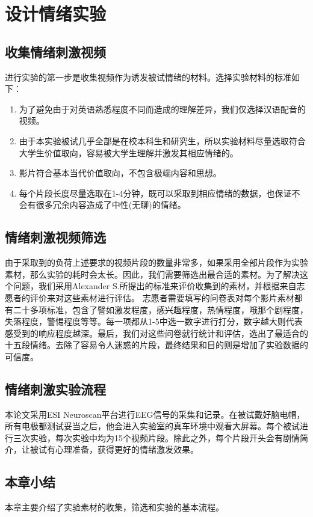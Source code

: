 
\chapter{设计情绪实验}
\label{chap:chap4}

\section{收集情绪刺激视频}
	进行实验的第一步是收集视频作为诱发被试情绪的材料。选择实验材料的标准如下：
	\begin{enumerate}
	\item 为了避免由于对英语熟悉程度不同而造成的理解差异，我们仅选择汉语配音的视频。
	\item 由于本实验被试几乎全部是在校本科生和研究生，所以实验材料尽量选取符合大学生价值取向，容易被大学生理解并激发其相应情绪的。
	
	\item 影片符合基本当代价值取向，不包含极端内容和思想。
	\item 每个片段长度尽量选取在1-4分钟，既可以采取到相应情绪的数据，也保证不会有很多冗余内容造成了中性(无聊)的情绪。
	\end{enumerate}
	
\section{情绪刺激视频筛选}
	由于采取到的负荷上述要求的视频片段的数量非常多，如果采用全部片段作为实验素材，那么实验的耗时会太长。因此，我们需要筛选出最合适的素材。为了解决这个问题，我们采用Alexander S.所提出的标准来评价收集到的素材，并根据来自志愿者的评价来对这些素材进行评估。
	志愿者需要填写的问卷表对每个影片素材都有二十多项标准，包含了譬如激发程度，感兴趣程度，热情程度，哦那个剧程度，失落程度，警惕程度等等。每一项都从1-5中选一数字进行打分，数字越大则代表感受到的响应程度越深。最后，我们对这些问卷就行统计和评估，选出了最适合的十五段情绪。去除了容易令人迷惑的片段，最终结果和目的则是增加了实验数据的可信度。
	
\section{情绪刺激实验流程}
	本论文采用ESI Neuroscan平台进行EEG信号的采集和记录。在被试戴好脑电帽，所有电极都测试妥当之后，他会进入实验室的真车环境中观看大屏幕。每个被试进行三次实验，每次实验中均为15个视频片段。除此之外，每个片段开头会有剧情简介，让被试有心理准备，获得更好的情绪激发效果。
\section{本章小结}
	本章主要介绍了实验素材的收集，筛选和实验的基本流程。